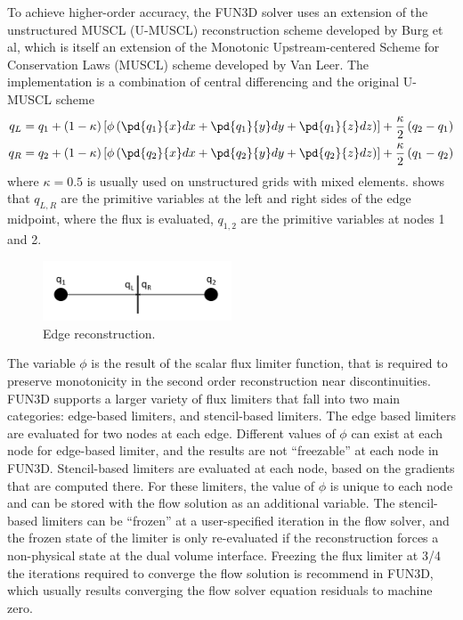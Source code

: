 To achieve higher-order accuracy, the FUN3D solver uses an extension of the
unstructured MUSCL (U-MUSCL) reconstruction scheme developed by Burg et
al\cite{burg2005higher,burg2003verification}, which is itself an extension of
the Monotonic Upstream-centered Scheme for Conservation Laws (MUSCL) scheme
developed by Van Leer\cite{van1979towards}.  The implementation is a combination
of central differencing and the original U-MUSCL scheme
\begin{equation}
  \begin{aligned}
    q_L &= q_1 + (1-\kappa)\left[ \phi\left( \pd{q_1}{x}dx + \pd{q_1}{y}dy +
    \pd{q_1}{z}dz \right) \right] + \frac{\kappa}{2}\left( q_2 - q_1 \right) \\
    q_R &= q_2 + (1-\kappa)\left[ \phi\left( \pd{q_2}{x}dx + \pd{q_2}{y}dy +
    \pd{q_2}{z}dz \right) \right] + \frac{\kappa}{2}\left( q_1 - q_2 \right)
  \end{aligned}
  \label{u-muscl}
\end{equation}
where $\kappa = 0.5$ is usually used on unstructured grids with mixed elements.
 shows that $q_{L,R}$ are the primitive variables at the
left and right sides of the edge midpoint, where the flux is evaluated,
$q_{1,2}$ are the primitive variables at nodes 1 and 2.
\begin{figure}[h]
  \centering
  \includegraphics[width=0.5\textwidth]{figures/edge_reconstruction.png}
  \caption{Edge reconstruction.}
  \label{fig:edge-recons}
\end{figure}
The variable $\phi$ is the result of the scalar flux limiter function, that is
required to preserve monotonicity in the second order reconstruction near
discontinuities.  FUN3D supports a larger variety of flux limiters that fall
into two main categories: edge-based limiters, and stencil-based limiters.  The
edge based limiters are evaluated for two nodes at each edge.  Different values
of $\phi$ can exist at each node for edge-based limiter, and the results are not
``freezable'' at each node in FUN3D. Stencil-based limiters are evaluated at
each node, based on the gradients that are computed there.  For these limiters,
the value of $\phi$ is unique to each node and can be stored with the flow
solution as an additional variable.  The stencil-based limiters can be
``frozen'' at a user-specified iteration in the flow solver, and the frozen
state of the limiter is only re-evaluated if the reconstruction forces a
non-physical state at the dual volume interface.  Freezing the flux limiter at
3/4 the iterations required to converge the flow solution is recommend in
FUN3D\cite{biedron2016fun3d}, which usually results converging the flow solver
equation residuals to machine zero.

